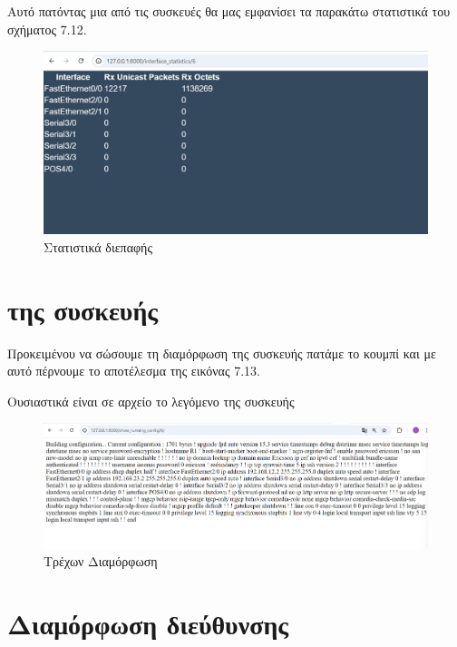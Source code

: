\FloatBarrier

\noindent Αυτό πατόντας μια από τις συσκευές θα μας εμφανίσει τα παρακάτω στατιστικά του σχήματος 7.12.

\FloatBarrier


\begin{figure}[h]
	\centering
	\includegraphics[width=1.0\textwidth]{graphics/interface_statistics.png}
	\caption{Στατιστικά διεπαφής}
\end{figure}


\section{ της συσκευής}

Προκειμένου να σώσουμε τη διαμόρφωση της συσκευής πατάμε το κουμπί
 και με αυτό πέρνουμε το αποτέλεσμα της εικόνας 7.13.

\noindent Ουσιαστικά είναι σε  αρχείο το λεγόμενο  της συσκευής

\FloatBarrier

\begin{figure}[h]
	\centering
	\includegraphics[width=1.0\textwidth]{graphics/running_config.png}
	\caption{Τρέχων Διαμόρφωση}
\end{figure}

\FloatBarrier


\section{Διαμόρφωση διεύθυνσης }


